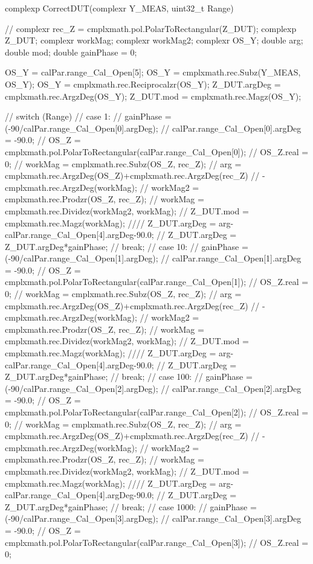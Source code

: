 complexp CorrectDUT(complexr Y_MEAS, uint32_t Range) {
//	complexr rec_Z = cmplxmath.pol.PolarToRectangular(Z_DUT);
	complexp Z_DUT;
	complexr workMag;
	complexr workMag2;
	complexr OS_Y;
	double arg;
	double mod;
	double gainPhase = 0;

	OS_Y = calPar.range_Cal_Open[5];
	OS_Y = cmplxmath.rec.Subz(Y_MEAS, OS_Y);
	OS_Y = cmplxmath.rec.Reciprocalzr(OS_Y);
	Z_DUT.argDeg = cmplxmath.rec.ArgzDeg(OS_Y);
	Z_DUT.mod = cmplxmath.rec.Magz(OS_Y);

//	switch (Range) {
//	case 1:
//		gainPhase = (-90/calPar.range_Cal_Open[0].argDeg);
//		calPar.range_Cal_Open[0].argDeg = -90.0;
//		OS_Z = cmplxmath.pol.PolarToRectangular(calPar.range_Cal_Open[0]);
//		OS_Z.real = 0;
//		workMag = cmplxmath.rec.Subz(OS_Z, rec_Z);
//		arg = cmplxmath.rec.ArgzDeg(OS_Z)+cmplxmath.rec.ArgzDeg(rec_Z)
//				-cmplxmath.rec.ArgzDeg(workMag);
//		workMag2 = cmplxmath.rec.Prodzr(OS_Z, rec_Z);
//		workMag = cmplxmath.rec.Dividez(workMag2, workMag);
//		Z_DUT.mod = cmplxmath.rec.Magz(workMag);
////		Z_DUT.argDeg = arg-calPar.range_Cal_Open[4].argDeg-90.0;
//		Z_DUT.argDeg = Z_DUT.argDeg*gainPhase;
//		break;
//	case 10:
//		gainPhase = (-90/calPar.range_Cal_Open[1].argDeg);
//		calPar.range_Cal_Open[1].argDeg = -90.0;
//		OS_Z = cmplxmath.pol.PolarToRectangular(calPar.range_Cal_Open[1]);
//		OS_Z.real = 0;
//		workMag = cmplxmath.rec.Subz(OS_Z, rec_Z);
//		arg = cmplxmath.rec.ArgzDeg(OS_Z)+cmplxmath.rec.ArgzDeg(rec_Z)
//				-cmplxmath.rec.ArgzDeg(workMag);
//		workMag2 = cmplxmath.rec.Prodzr(OS_Z, rec_Z);
//		workMag = cmplxmath.rec.Dividez(workMag2, workMag);
//		Z_DUT.mod = cmplxmath.rec.Magz(workMag);
////		Z_DUT.argDeg = arg-calPar.range_Cal_Open[4].argDeg-90.0;
//		Z_DUT.argDeg = Z_DUT.argDeg*gainPhase;
//		break;
//	case 100:
//		gainPhase = (-90/calPar.range_Cal_Open[2].argDeg);
//		calPar.range_Cal_Open[2].argDeg = -90.0;
//		OS_Z = cmplxmath.pol.PolarToRectangular(calPar.range_Cal_Open[2]);
//		OS_Z.real = 0;
//		workMag = cmplxmath.rec.Subz(OS_Z, rec_Z);
//		arg = cmplxmath.rec.ArgzDeg(OS_Z)+cmplxmath.rec.ArgzDeg(rec_Z)
//				-cmplxmath.rec.ArgzDeg(workMag);
//		workMag2 = cmplxmath.rec.Prodzr(OS_Z, rec_Z);
//		workMag = cmplxmath.rec.Dividez(workMag2, workMag);
//		Z_DUT.mod = cmplxmath.rec.Magz(workMag);
////		Z_DUT.argDeg = arg-calPar.range_Cal_Open[4].argDeg-90.0;
//		Z_DUT.argDeg = Z_DUT.argDeg*gainPhase;
//		break;
//	case 1000:
//		gainPhase = (-90/calPar.range_Cal_Open[3].argDeg);
//		calPar.range_Cal_Open[3].argDeg = -90.0;
//		OS_Z = cmplxmath.pol.PolarToRectangular(calPar.range_Cal_Open[3]);
//		OS_Z.real = 0;
}}
